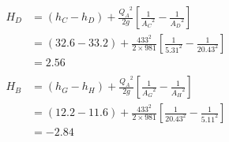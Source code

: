\documentclass[a4paper]{article}
\begin{document}
\begin{align*}
H_D &= (h_C - h_D) + \frac{{Q_A}^2}{2g}\left[\frac{1}{{A_C}^2} - 
                                             \frac{1}{{A_D}^2}\right] \\
    &= (32.6 - 33.2) + \frac{433^2}{2\times981}\left[\frac{1}{{5.31}^2} - 
                                             \frac{1}{{20.43}^2}\right] \\
    &= 2.56 \\
\\
H_B &= (h_G - h_H) + \frac{{Q_A}^2}{2g}\left[\frac{1}{{A_G}^2} - 
                                             \frac{1}{{A_H}^2}\right] \\
    &= (12.2 - 11.6) + \frac{433^2}{2\times981}\left[\frac{1}{{20.43}^2} - 
                                             \frac{1}{{5.11}^2}\right] \\
    &= -2.84 \\
\end{align*}
\end{document}
